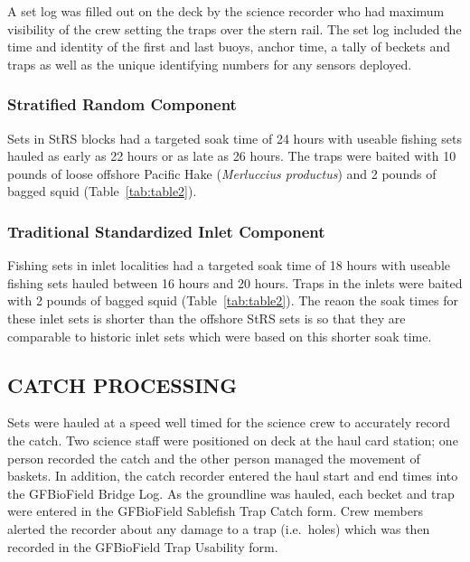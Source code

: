 \documentclass[12pt]{article}\usepackage[]{graphicx}\usepackage[]{color}
\begin{document}
A set log was filled out on the deck by the science recorder who had maximum visibility of the crew setting the traps over the stern rail. The set log included the time and identity of the first and last buoys, anchor time, a tally of beckets and traps as well as the unique identifying numbers for any sensors deployed.

\hypertarget{stratified-random-component}{%
\subsubsection{Stratified Random Component}\label{stratified-random-component}}

Sets in StRS blocks had a targeted soak time of 24 hours with useable fishing sets hauled as early as 22 hours or as late as 26 hours. The traps were baited with 10 pounds of loose offshore Pacific Hake (\emph{Merluccius productus}) and 2 pounds of bagged squid (Table~\ref{tab:table2}).

\hypertarget{traditional-standardized-inlet-component}{%
\subsubsection{Traditional Standardized Inlet Component}\label{traditional-standardized-inlet-component}}

Fishing sets in inlet localities had a targeted soak time of 18 hours with useable fishing sets hauled between 16 hours and 20 hours. Traps in the inlets were baited with 2 pounds of bagged squid (Table~\ref{tab:table2}). The reaon the soak times for these inlet sets is shorter than the offshore StRS sets is so that they are comparable to historic inlet sets which were based on this shorter soak time.

\hypertarget{catch-processing}{%
\subsection{CATCH PROCESSING}\label{catch-processing}}

Sets were hauled at a speed well timed for the science crew to accurately record the catch. Two science staff were positioned on deck at the haul card station; one person recorded the catch and the other person managed the movement of baskets. In addition, the catch recorder entered the haul start and end times into the GFBioField Bridge Log. As the groundline was hauled, each becket and trap were entered in the GFBioField Sablefish Trap Catch form. Crew members alerted the recorder about any damage to a trap (i.e.~holes) which was then recorded in the GFBioField Trap Usability form.
\end{document}
